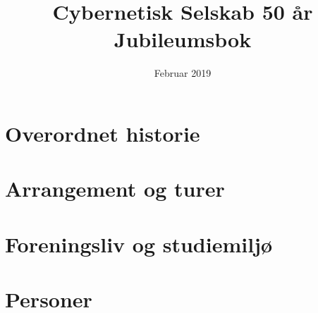 \documentclass[hidelinks, openany, 12pt, a4paper]{book}
\title{Cybernetisk Selskab 50 år Jubileumsbok } %
\author{}
\date{Februar 2019}
\begin{document}
\maketitle



\part{Overordnet historie}













\part{Arrangement og turer}









\part{Foreningsliv og studiemiljø}












\part{Personer}











\end{document}
